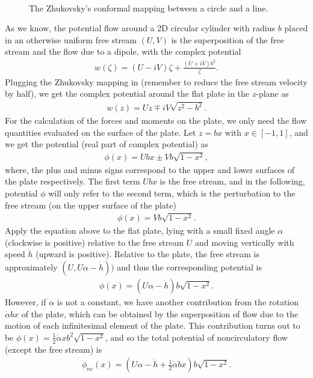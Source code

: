 \begin{figure}
 \centering
 \noindent \\
 
\caption{The Zhukovsky's conformal mapping between a circle and a line.}
\label{fig:ConformalMapping}
\end{figure}

As we know, the potential flow around a 2D circular cylinder with radius $b$ placed in an otherwise uniform free stream $(U,V)$ is the superposition of the free stream and the flow due to a dipole, with the complex potential
\begin{align}
w(\zeta) = (U-iV)\zeta+\frac{(U+iV)b^2}{\zeta}.
\end{align} 
Plugging the Zhukovsky mapping in (remember to reduce the free stream velocity by half), we get the complex potential around the flat plate in the $z$-plane as
\begin{align}
w(z) = Uz \mp iV\sqrt{z^2-b^2}.
\end{align} 
For the calculation of the forces and moments on the plate, we only need the flow quantities evaluated on the surface of the plate.
Let $z = bx$ with $x \in [-1, 1]$, and we get the potential (real part of complex potential) as
\begin{align}
\phi(x) = Ubx \pm Vb\sqrt{1-x^2},
\end{align} 
where, the plus and minus signs correspond to the upper and lower surfaces of the plate respectively. 
The first term $Ubx$ is the free stream, and in the following, potential $\phi$ will only refer to the second term, which is the perturbation to the free stream (on the upper surface of the plate)
\begin{align}
\phi(x) = Vb\sqrt{1-x^2}.
\end{align} 
Apply the equation above to the flat plate, lying with a small fixed angle $\alpha$ (clockwise is positive) relative to the free stream $U$ and moving vertically with speed $\dot{h}$ (upward is positive).
Relative to the plate, the free stream is approximately $(U, U \alpha - \dot{h}))$ and thus the corresponding potential is
\begin{align}
\phi(x) = (U \alpha - \dot{h}) b \sqrt{1-x^2}.
\end{align} 
However, if $\alpha$ is not a constant, we have another contribution from the rotation $\dot{\alpha}bx$ of the plate, which can be obtained by the superposition of flow due to the motion of each infinitesimal element of the plate.
This contribution turns out to be $\phi(x) = \frac{1}{2}\dot{\alpha}xb^2\sqrt{1-x^2}$, and so the total potential of noncirculatory flow (except the free stream) is
\begin{align}
\phi_{nc}(x) = (U\alpha - \dot{h} + \frac{1}{2}\dot{\alpha}bx) b\sqrt{1-x^2}.
\end{align} 

